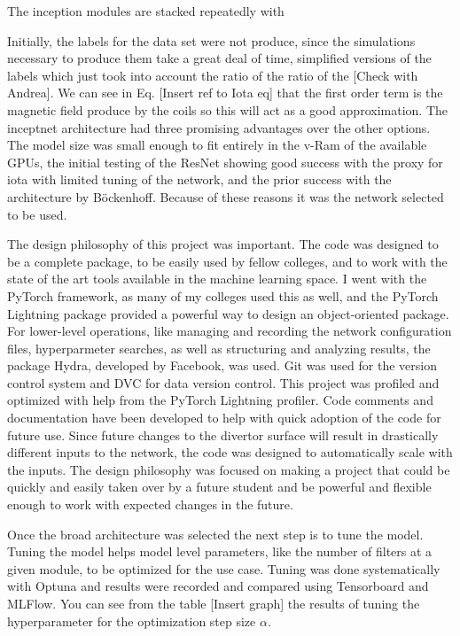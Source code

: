 The inception modules are stacked repeatedly with




Initially, the labels for the data set were not produce, since the simulations necessary to produce them take a great deal of time, simplified versions of the labels which just took into account the ratio of the ratio of the [Check with Andrea].
We can see in Eq. [Insert ref to Iota eq] that the first order term is the magnetic field produce by the coils so this will act as a good approximation.
The inceptnet architecture had three promising advantages over the other options.
The model size was small enough to fit entirely in the v-Ram of the available GPUs, the initial testing of the ResNet showing good success with the proxy for iota with limited tuning of the network, and the prior success with the architecture by Böckenhoff.
Because of these reasons it was the network selected to be used.


\label{sec:code:philosophy}
The design philosophy of this project was important. The code was designed to be a complete package, to be easily used by fellow colleges, and to work with the state of the art tools available in the machine learning space.
I went with the PyTorch framework, as many of my colleges used this as well, and the PyTorch Lightning package provided a powerful way to design an object-oriented package.
For lower-level operations, like managing and recording the network configuration files, hyperparmeter searches, as well as structuring and analyzing results, the package Hydra, developed by Facebook, was used.
Git was used for the version control system and DVC for data version control.
This project was profiled and optimized with help from the PyTorch Lightning profiler.
Code comments and documentation have been developed to help with quick adoption of the code for future use.
Since future changes to the divertor surface will result in drastically different inputs to the network, the code was designed to automatically scale with the inputs.
The design philosophy was focused on making a project that could be quickly and easily taken over by a future student and be powerful and flexible enough to work with expected changes in the future.



\label{sec:code:hyperparameters}

Once the broad architecture was selected the next step is to tune the model.
Tuning the model helps model level parameters, like the number of filters at a given module, to be optimized for the use case.
Tuning was done systematically with Optuna and results were recorded and compared using Tensorboard and MLFlow.
You can see from the table [Insert graph] the results of tuning the hyperparameter for the optimization step size $\alpha$.





